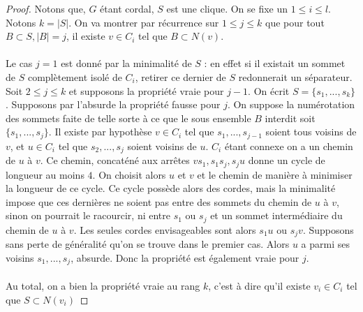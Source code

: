 \documentclass{scrartcl}
\begin{document}
\begin{flushleft}
\begin{proof}
    Notons que, $G$ étant cordal, $S$ est une clique. On se fixe un $1 \leq i \leq l$.
    Notons $k = |S|$. On va montrer par récurrence sur $1 \leq j \leq k$ que pour tout $B \subset S, |B| = j$,
    il existe $v \in C_i$ tel que $B \subset N(v)$.
    \\~\\
    Le cas $j = 1$ est donné par la minimalité de $S$ : en effet si il existait un sommet de $S$ complètement isolé de $C_i$, retirer
    ce dernier de $S$ redonnerait un séparateur.\\
    Soit $2 \leq j \leq k$ et supposons la propriété vraie pour $j-1$. On écrit $S = \{s_1, ..., s_k\}$. Supposons par l'absurde la propriété
    fausse pour $j$. On suppose la numérotation des sommets faite de telle sorte à ce que le sous ensemble $B$ interdit soit
    $\{s_1, ..., s_j\}$. Il existe par hypothèse $v \in C_i$ tel que $s_1, ..., s_{j-1}$ soient tous voisins de $v$, et $u \in C_i$ tel que
    $s_2, ..., s_j$ soient voisins de $u$. $C_i$ étant connexe on a un chemin de $u$ à $v$. Ce chemin, concaténé aux arrêtes $vs_1, s_1 s_j, s_j u$
    donne un cycle de longueur au moins $4$. On choisit alors $u$ et $v$ et le chemin de manière à minimiser la longueur de ce cycle.
    Ce cycle possède alors des cordes, mais la minimalité impose que ces dernières ne soient pas entre des sommets du chemin de $u$ à $v$,
    sinon on pourrait le racourcir, ni entre $s_1$ ou $s_j$ et un sommet intermédiaire du chemin de $u$ à $v$. Les seules cordes envisageables
    sont alors $s_1u$ ou $s_jv$. Supposons sans perte de généralité qu'on se trouve dans le premier cas. Alors $u$ a parmi ses voisins
    $s_1, ..., s_j$, absurde. Donc la propriété est également vraie pour $j$.
    \\~\\
    Au total, on a bien la propriété vraie au rang $k$, c'est à dire qu'il existe $v_i \in C_i$ tel que $S \subset N(v_i)$
\end{proof}

\end{flushleft}
\end{document}
